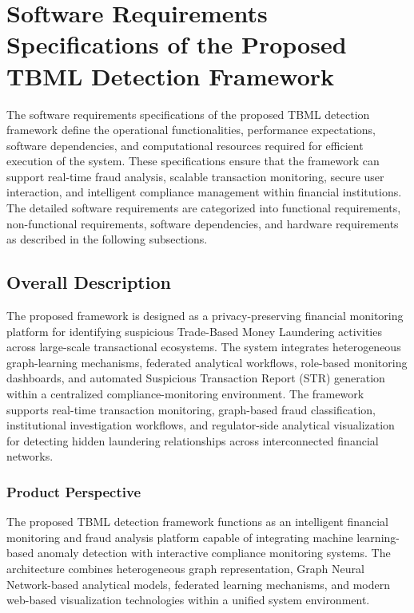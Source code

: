 
\chapter{Software Requirements Specifications  of the Proposed TBML Detection Framework}

The software requirements specifications of the proposed TBML detection framework define the operational functionalities, performance expectations, software dependencies, and computational resources required for efficient execution of the system. These specifications ensure that the framework can support real-time fraud analysis, scalable transaction monitoring, secure user interaction, and intelligent compliance management within financial institutions. The detailed software requirements are categorized into functional requirements, non-functional requirements, software dependencies, and hardware requirements as described in the following subsections.
\section[Overall Description]{\textbf{Overall Description}}

The proposed framework is designed as a privacy-preserving financial monitoring platform for identifying suspicious Trade-Based Money Laundering activities across large-scale transactional ecosystems. The system integrates heterogeneous graph-learning mechanisms, federated analytical workflows, role-based monitoring dashboards, and automated Suspicious Transaction Report (STR) generation within a centralized compliance-monitoring environment. The framework supports real-time transaction monitoring, graph-based fraud classification, institutional investigation workflows, and regulator-side analytical visualization for detecting hidden laundering relationships across interconnected financial networks.

\subsection[Product Perspective]{\textbf{Product Perspective}}

The proposed TBML detection framework functions as an intelligent financial monitoring and fraud analysis platform capable of integrating machine learning-based anomaly detection with interactive compliance monitoring systems. The architecture combines heterogeneous graph representation, Graph Neural Network-based analytical models, federated learning mechanisms, and modern web-based visualization technologies within a unified system environment.

